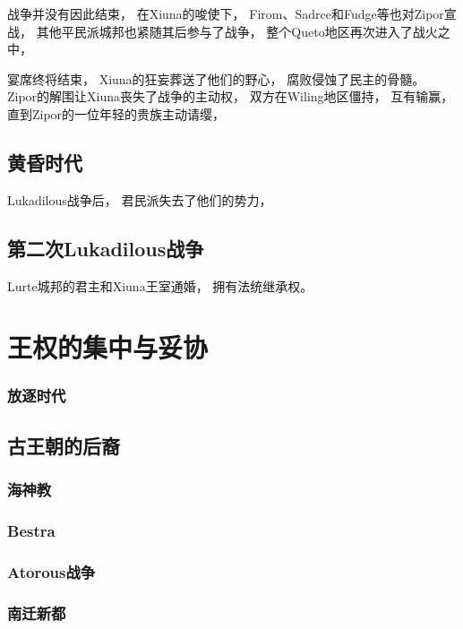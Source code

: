 \documentclass[UTF8,12pt,draft]{ctexbook}
\begin{document}
                战争并没有因此结束，
                在Xiuna的唆使下，
                Firom、Sadrce和Fudge等也对Zipor宣战，
                其他平民派城邦也紧随其后参与了战争，
                整个Queto地区再次进入了战火之中，

                宴席终将结束，
                Xiuna的狂妄葬送了他们的野心，
                腐败侵蚀了民主的骨髓。
                Zipor的解围让Xiuna丧失了战争的主动权，
                双方在Wiling地区僵持，
                互有输赢，
                直到Zipor的一位年轻的贵族主动请缨，
                

            \subsection{黄昏时代}
                Lukadilous战争后，
                君民派失去了他们的势力，

            \subsection{第二次Lukadilous战争}
                Lurte城邦的君主和Xiuna王室通婚，
                拥有法统继承权。

        \section{王权的集中与妥协}
                \subsubsection{放逐时代}
            \subsection{古王朝的后裔}
                \subsubsection{海神教}
                \subsubsection{Bestra}
                \subsubsection{Atorous战争}
                \subsubsection{南迁新都}
\end{document}
